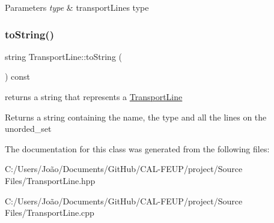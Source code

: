 \begin{DoxyParams}{Parameters}
{\em type} & transport\+Line\textquotesingle{}s type \\
\hline
\end{DoxyParams}
\mbox{\label{class_transport_line_a4ed5f0b15e7d9893bc24b68f81918b45}} 
\subsubsection{\texorpdfstring{to\+String()}{toString()}}
{\footnotesize\ttfamily string Transport\+Line\+::to\+String (\begin{DoxyParamCaption}{ }\end{DoxyParamCaption}) const}



returns a string that represents a \hyperlink{class_transport_line}{Transport\+Line} 

\begin{DoxyReturn}{Returns}
a string containing the name, the type and all the lines on the unorded\+\_\+set 
\end{DoxyReturn}


The documentation for this class was generated from the following files\+:\begin{DoxyCompactItemize}
\item 
C\+:/\+Users/\+João/\+Documents/\+Git\+Hub/\+C\+A\+L-\/\+F\+E\+U\+P/project/\+Source Files/Transport\+Line.\+hpp\item 
C\+:/\+Users/\+João/\+Documents/\+Git\+Hub/\+C\+A\+L-\/\+F\+E\+U\+P/project/\+Source Files/Transport\+Line.\+cpp\end{DoxyCompactItemize}

